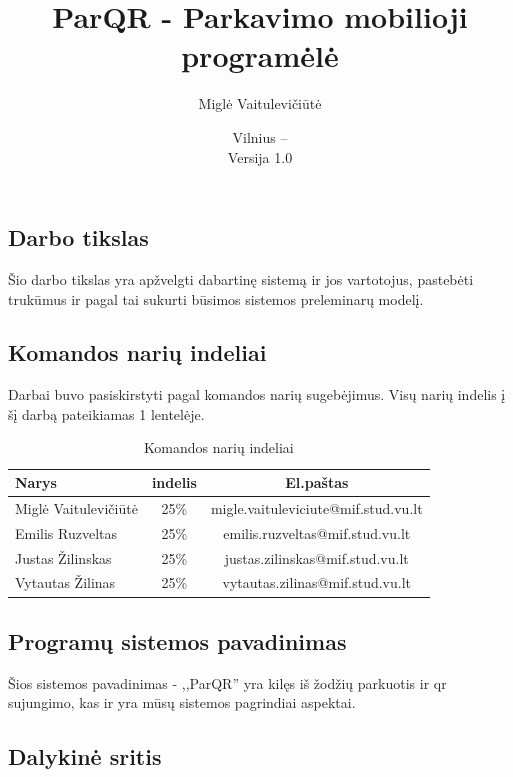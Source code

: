 \documentclass{VUMIFPSkursinis}
\title{ParQR - Parkavimo mobilioji programėlė}
\author{Miglė Vaitulevičiūtė}
\date{Vilnius – \the\year\\Versija 1.0}
\begin{document}
\maketitle

\tableofcontents
{}

\subsection*{Darbo tikslas}

Šio darbo tikslas yra apžvelgti dabartinę sistemą ir jos vartotojus, pastebėti trukūmus ir pagal tai sukurti būsimos sistemos preleminarų modelį.

\subsection*{Komandos narių indeliai}

Darbai buvo pasiskirstyti pagal komandos narių sugebėjimus. Visų narių indelis į šį darbą pateikiamas 1 lentelėje.

\begin{table}[H]\footnotesize
  \centering
  \caption{Komandos narių indeliai}
  {\begin{tabular}{|l|c|c|} \hline
    Narys & indelis & El.paštas \\
    \hline
    Miglė Vaitulevičiūtė& 25\% & migle.vaituleviciute@mif.stud.vu.lt       		\\
    Emilis Ruzveltas 	& 25\% & emilis.ruzveltas@mif.stud.vu.lt       			\\
    Justas Žilinskas 	& 25\% & justas.zilinskas@mif.stud.vu.lt       			\\
    Vytautas Žilinas 	& 25\% & vytautas.zilinas@mif.stud.vu.lt       			\\
    \hline
  \end{tabular}}
  \label{tab:komanda}
\end{table}


\subsection*{Programų sistemos pavadinimas}

Šios sistemos pavadinimas - ,,ParQR'' yra kilęs iš žodžių parkuotis ir qr sujungimo, kas ir yra mūsų sistemos pagrindiai aspektai.

\subsection*{Dalykinė sritis}
\end{document}
